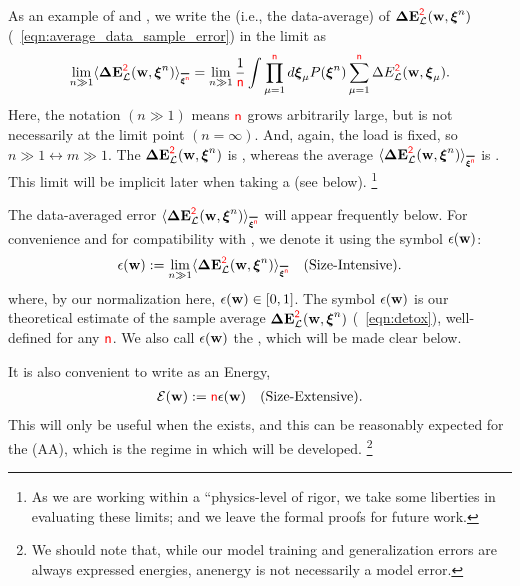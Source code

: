 As an example of \SizeExtensivity and \SizeIntensivity, 
we write the \ExpectedValue (i.e., the data-average) of \DataSampleError $\mathbf{\Delta {E}}^{{\color{red}\sf{2}}}_{\mathcal{L}}(\mathbf{w}, \boldsymbol{\xi}^{n})$ (\EQN~\ref{eqn:average_data_sample_error})
in the \LargeN limit as
\begin{align}
  \lim_{n\gg 1} 
  \langle \DETOPXI\rangle_{\AVGNDXIn}=
  \lim_{n\gg 1}\frac{1}{\ND}
\int \prod_{\mu=1}^{\ND}d\XI_{\mu}P(\NDXIn)
  \sum_{\mu=1}^{\ND}\DEL(\WVEC,\XI_{\mu}) .
\end{align}
Here, the notation $(n \gg 1)$ means ${\color{red}\sf{n}}$ grows arbitrarily large, but is not necessarily
at the limit point $(n=\infty)$. And, again, the load is fixed, so $n\gg 1 \leftrightarrow m \gg 1$.
The \TotalDataSampleError $\mathbf{\Delta {E}}^{{\color{red}\sf{2}}}_{\mathcal{L}}(\mathbf{w}, \boldsymbol{\xi}^{n})$ is \SizeExtensive, whereas the
average $\langle\DETOPXI\rangle_{\AVGNDXIn}$ is \SizeIntensive.
This limit will be implicit later when taking a \SaddlePointApproximation (see below).
\footnote{As we are working within a ``physics-level of rigor, we take some liberties in evaluating these \LargeN limits; and we leave the formal proofs for future work.  }

The data-averaged error  $\langle \DETOPXI \rangle_{\AVGNDXIn}$ will appear frequently below.
For convenience and for compatibility with \cite{SST92}, we denote it using the symbol $\epsilon({\mathbf{w}})$:
\begin{align}
 \label{eqn:epsl}
 \EPSLw:=\lim_{n\gg 1}  \langle \DETOPXI \rangle_{\AVGNDXIn} \quad \text{(\SizeIntensive)}.
\end{align}
where, by our normalization here, $\epsilon({\mathbf{w}}) \in [0,1]$.
The symbol $\epsilon({\mathbf{w}})$ is our theoretical estimate of the sample average $\mathbf{\Delta {E}}^{{\color{red}\sf{2}}}_{\mathcal{L}}(\mathbf{w}, \boldsymbol{\xi}^{n})$ (\EQN~\ref{eqn:detox}),
well-defined for any ${\color{red}\sf{n}}$.
We also call $\epsilon({\mathbf{w}})$ the \emph{\EffectivePotential}, which will be made clear below.

It is also convenient to write \emph{\TotalEffectivePotential} as an Energy, 
\begin{align}
 \label{eqn:detox}
 \mathcal{E}(\mathbf{w}) := {\color{red}\sf{n}}\epsilon({\mathbf{w}})\quad \text{(Size-Extensive)}.
\end{align}
This will only be useful when the \ThermodynamicLimit exists, and this
can be reasonably expected for the \AnnealedApproximation (AA),
which is the regime in which \SETOL will be developed.%
\footnote{We should note that, while our model training and generalization errors are always expressed energies, anenergy is not necessarily a model error. }


